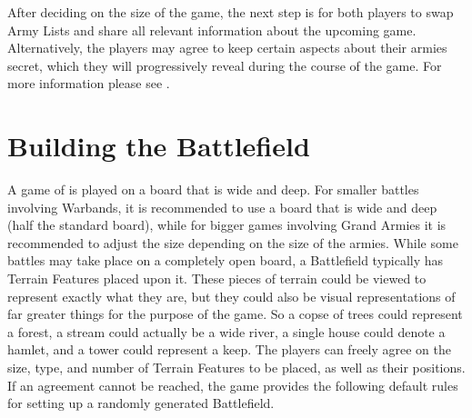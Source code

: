After deciding on the size of the game, the next step is for both players to swap Army Lists and share all relevant information about the upcoming game. Alternatively, the players may agree to keep certain aspects about their armies secret, which they will progressively reveal during the course of the game. For more information please see .

\newpage
\section{Building the Battlefield}
\label{building_the_battlefield}

A game of \nameofthegame{} is played on a board that is  wide and  deep. For smaller battles involving Warbands, it is recommended to use a board that is  wide and  deep (half the standard board), while for bigger games involving Grand Armies it is recommended to adjust the size depending on the size of the armies. While some battles may take place on a completely open board, a Battlefield typically has Terrain Features placed upon it. These pieces of terrain could be viewed to represent exactly what they are, but they could also be visual representations of far greater things for the purpose of the game. So a copse of trees could represent a forest, a stream could actually be a wide river, a single house could denote a hamlet, and a tower could represent a keep. The players can freely agree on the size, type, and number of Terrain Features to be placed, as well as their positions. If an agreement cannot be reached, the game provides the following default rules for setting up a randomly generated Battlefield.

